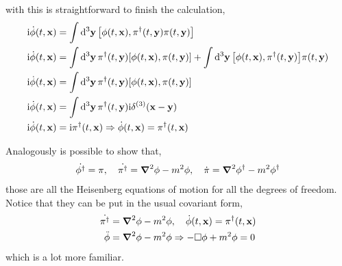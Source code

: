 with this is straightforward to finish the calculation,
\begin{align}
    \im\dot\phi\qty(t,\vb x)&=\int\dd[3]{\vb y}\comm{\phi\qty(t,\vb x)}{\pi^\dagger\qty(t,\vb y)\pi\qty(t,\vb y)}\\
    \im\dot\phi\qty(t,\vb x)&=\int\dd[3]{\vb y}\pi^\dagger\qty(t,\vb y)\comm{\phi\qty(t,\vb x)}{\pi\qty(t,\vb y)}+\int\dd[3]{\vb y}\comm{\phi\qty(t,\vb x)}{\pi^\dagger\qty(t,\vb y)} \pi\qty(t,\vb y)\\
    \im\dot\phi\qty(t,\vb x)&=\int\dd[3]{\vb y}\pi^\dagger\qty(t,\vb y)\comm{\phi\qty(t,\vb x)}{\pi\qty(t,\vb y)}\\
    \im\dot\phi\qty(t,\vb x)&=\int\dd[3]{\vb y}\pi^\dagger\qty(t,\vb y)\im\delta^{\qty(3)}\qty(\vb x-\vb y)\\
    \im\dot\phi\qty(t,\vb x)&=\im\pi^\dagger\qty(t,\vb x)\Rightarrow \dot\phi\qty(t,\vb x)=\pi^\dagger\qty(t,\vb x)
\end{align}

Analogously is possible to show that,
\begin{align}
    \dot{\phi^\dagger} = \pi,\ \ \ \dot {\pi^\dagger} = \grad^2\phi-m^2\phi,\ \ \ \dot {\pi} = \grad^2\phi^\dagger-m^2\phi^\dagger
\end{align}
those are all the Heisenberg equations of motion for all the degrees of 
freedom. Notice that they can be put in the usual covariant form,
\begin{align}
    \dot {\pi^\dagger} &= \grad^2\phi-m^2\phi,\ \ \ \dot\phi\qty(t,\vb x)=\pi^\dagger\qty(t,\vb x)\\
    \ddot{\phi} &= \grad^2\phi-m^2\phi\Rightarrow -\Box\phi+m^2\phi = 0
\end{align}
which is a lot more familiar.

\probitem{}


